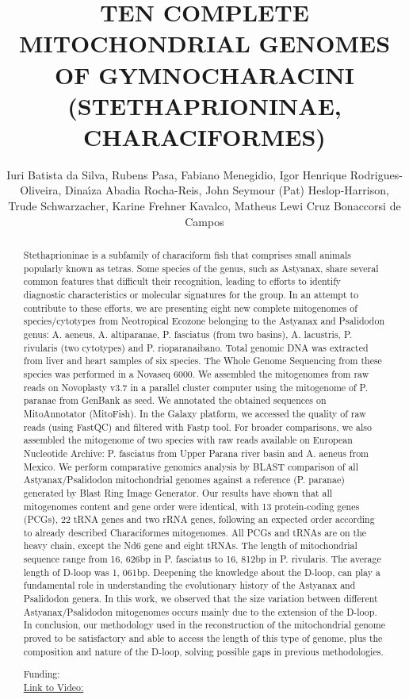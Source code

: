 \documentclass[twoside]{article}
\title{\vspace{-15mm}\fontsize{24pt}{10pt}\selectfont\textbf{ TEN COMPLETE MITOCHONDRIAL GENOMES OF GYMNOCHARACINI (STETHAPRIONINAE,  CHARACIFORMES) }} %
\author{ Iuri Batista da Silva,  Rubens Pasa,  Fabiano Menegidio,  Igor Henrique Rodrigues-Oliveira,  Dina\'{\i}za Abadia Rocha-Reis,  John Seymour (Pat) Heslop-Harrison,  Trude Schwarzacher,  Karine Frehner Kavalco,  Matheus Lewi Cruz Bonaccorsi de Campos }
\affil{ UNIVERSIDADE FEDERAL DE MINAS GERAIS,  UNIVERSIDADE DE MOGI DAS CRUZES }
\date{}
\begin{document}
  
  
  \maketitle %
  
  
  \thispagestyle{fancy} %
  
  
  \begin{abstract}
  Stethaprioninae is a subfamily of characiform fish that comprises small animals popularly known as tetras. Some species of the genus,  such as Astyanax,  share several common features that difficult their recognition,  leading to efforts to identify diagnostic characteristics or molecular signatures for the group. In an attempt to contribute to these efforts,  we are presenting eight new complete mitogenomes of species/cytotypes from Neotropical Ecozone belonging to the Astyanax and Psalidodon genus: A. aeneus,  A. altiparanae,  P. fasciatus (from two basins),  A. lacustris,  P. rivularis (two cytotypes) and P. rioparanaibano. Total genomic DNA was extracted from liver and heart samples of six species. The Whole Genome Sequencing from these species was performed in a Novaseq 6000. We assembled the mitogenomes from raw reads on Novoplasty v3.7 in a parallel cluster computer using the mitogenome of P. paranae from GenBank as seed. We annotated the obtained sequences on MitoAnnotator (MitoFish). In the Galaxy platform,  we accessed the quality of raw reads (using FastQC) and filtered with Fastp tool. For broader comparisons,  we also assembled the mitogenome of two species with raw reads available on European Nucleotide Archive: P. fasciatus from Upper Parana river basin and A. aeneus from Mexico. We perform comparative genomics analysis by BLAST comparison of all Astyanax/Psalidodon mitochondrial genomes against a reference (P. paranae) generated by Blast Ring Image Generator. Our results have shown that all mitogenomes content and gene order were identical,  with 13 protein-coding genes (PCGs),  22 tRNA genes and two rRNA genes,  following an expected order according to already described Characiformes mitogenomes. All PCGs and tRNAs are on the heavy chain,  except the Nd6 gene and eight tRNAs. The length of mitochondrial sequence range from 16, 626bp in P. fasciatus to 16, 812bp in P. rivularis. The average length of D-loop was 1, 061bp. Deepening the knowledge about the D-loop,  can play a fundamental role in understanding the evolutionary history of the Astyanax and Psalidodon genera. In this work,  we observed that the size variation between different Astyanax/Psalidodon mitogenomes occurs mainly due to the extension of the D-loop. In conclusion,  our methodology used in the reconstruction of the mitochondrial genome proved to be satisfactory and able to access the length of this type of genome,  plus the composition and nature of the D-loop,  solving possible gaps in previous methodologies.
  
  Funding:   \\
  \href{http://ab3c.org.br/xpress_pres2020/xmxp2020-301462.html}{Link to Video:}

  \end{abstract}
   
  
\end{document}
